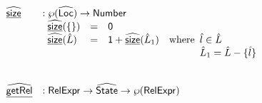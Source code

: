 \documentclass{article}
\newcommand{\lbr}{\ensuremath{\llbracket}}
\newcommand{\rbr}{\ensuremath{\rrbracket}}
\newcommand{\ifc}[1]{{\rm if}\begin{array}[t]{l}#1\end{array}}
\newcommand{\SF}[1]{\mbox{\textsf{#1}}}
\newcommand{\wherec}[1]{{\rm where}\begin{array}[t]{l}#1\end{array}}
\newcommand{\owc}{{\rm otherwise}}
\newcommand{\abs}[1]{\widehat{\SF{#1}}}
\newcommand{\aLoc}{\abs{Loc}}
\newcommand{\aState}{\abs{State}}
\newcommand{\aV}{\hat{\mathcal{V}}}
\newcommand{\powerset}[1]{\wp(#1)}
\newcommand{\ahf}[1]{\widehat{\underline{\sf #1}}}
\newcommand{\vfalse}{\SF{false}}
\newcommand{\rel}{\S}
\begin{document}
\[
\begin{array}{ll}
\ahf{size} & : \powerset{\aLoc} \rightarrow {\sf Number}\\
& \begin{array}{llll}
  \ahf{size}(\{\}) & = & {\sf 0}\\
  \ahf{size}( \hat{L} ) & = & {\sf 1} + \ahf{size}(\hat{L}_1) & \wherec { \hat{l} \in \hat{L}\\ \hat{L}_1 = \hat{L} - \{\hat{l}\}}\\
\end{array}\\
\\\\

\ahf{getRel} & : \SF{RelExpr} \rightarrow \aState \rightarrow \powerset{\SF{RelExpr}}\\

\end{array}\]
\end{document}
